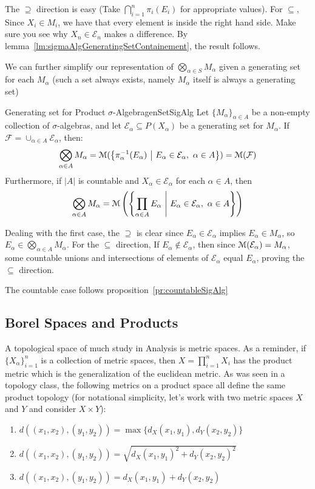 \documentclass[oneside]{book}
\newcommand{\CE}{\mathcal{E}}
\newcommand{\MM}{\EuScript{M}}
\newcommand{\FF}{\mathcal{F}}
\newcommand{\sse}{\subseteq}
\newcommand{\set}[2]{\left\{#1 \ \middle|\ #2\right\}}
\begin{document}
\begin{Proof}
	The $\supseteq$ direction is easy (Take $\bigcap_{i=1}^n \pi_i(E_i)$ for appropriate values). For $\sse$, Since $X_i
	\in M_i$, we have that every element is inside the right hand side. Make sure you see why $X_n \in \CE_n$ makes
	a difference. By lemma~\ref{lm:sigmaAlgGeneratingSetContainement}, the result follows. 
\end{Proof}

We can further simplify our representation of $\bigotimes_{\alpha \in S} M_\alpha$ given a generating set for each
$M_\alpha$ (such a set always exists, namely $M_\alpha$ itself is always a generating set)

\begin{prop}{Generating set for Product $\sigma$-Algebra}{genSetSigAlg}
	Let $\{M_\alpha\}_{\alpha \in A}$ be a non-empty collection of $\sigma$-algebras, and let $\CE_\alpha \sse
	P(X_\alpha)$ be a generating set for $M_\alpha$. If $\FF = \cup_{\alpha \in A} \CE_\alpha$, then:
	\[
		\bigotimes_{\alpha \in A} M_\alpha = \MM(\set{\pi_\alpha^{-1} (E_\alpha)}{E_\alpha \in \CE_\alpha,\ \alpha \in
		A}) = \MM(\FF)
	\]
	Furthermore, if $|A|$ is countable and $X_\alpha \in \CE_\alpha$ for each $\alpha \in A$, then
	\[
		\bigotimes_{\alpha \in A} M_\alpha = \MM\left(\set{\prod_{\alpha \in A} E_\alpha}{E_\alpha \in \CE_\alpha,\
			\alpha \in A}\right)
	\]
\end{prop}

\begin{Proof}
	Dealing with the first case, the $\supseteq$ is clear since $E_\alpha \in \CE_\alpha$ implies $E_\alpha \in
	M_\alpha$, so $E_\alpha \in \bigotimes_{\alpha \in A}M_\alpha$. For the $\sse $ direction, If $E_\alpha \notin
	\CE_\alpha$, then since $\MM(\CE_\alpha) = M_\alpha$, some countable unions and intersections of elements of $\CE_\alpha$ equal
	$E_\alpha$, proving the $\sse$ direction. 

	The countable case follows proposition~\ref{pr:countableSigAlg}
\end{Proof}

\subsection*{Borel Spaces and Products}

A topological space of much study in Analysis is metric spaces. As a reminder, if $\{X_\alpha\}_{i=1}^n$ is
a collection of metric spaces, then $X = \prod_{i=1}^n X_i$ has the product metric which is the generalization of the
euclidean metric. As was seen in a topology class, the following metrics on a product space all define the same product
topology (for notational simplicity, let's work with two metric spaces $X$ and $Y$ and consider $X\times Y$):
\begin{enumerate}
	\item $d((x_1, x_2), (y_1, y_2)) = \max\{d_X(x_1, y_1), d_Y(x_2, y_2)\}$
	\item $d((x_1, x_2), (y_1, y_2)) = \sqrt{d_X(x_1, y_1)^2 + d_Y(x_2, y_2)^2}$
	\item $d((x_1, x_2), (y_1, y_2)) = d_X(x_1, y_1) + d_Y(x_2, y_2)$
\end{enumerate}
\end{document}
